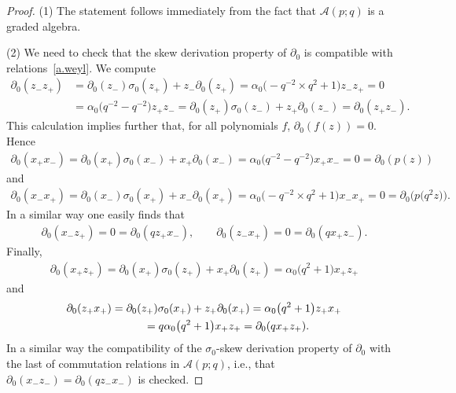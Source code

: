 \documentclass[pdftex]{sigma}
\numberwithin{equation}{section}
\def\AWeyl#1#2{{\mathcal{A}}(#1;#2)}
\begin{document}
\begin{proof}
(1) The statement follows immediately from the fact that $\AWeyl p q$ is a graded algebra.

(2) We need to check that the skew derivation property of $\partial_0$ is compatible with rela\-tions~\eqref{a.weyl}. We compute
\begin{align*}
\partial_0(z_-z_+) &= \partial_0(z_-)\sigma_0(z_+) + z_- \partial_0(z_+) = \alpha_0\big({-}q^{-2} \times q^2 + 1\big)z_- z_+ = 0\\
&= \alpha_0\big(q^{-2} - q^{-2}\big) z_+ z_- = \partial_0(z_+)\sigma_0(z_-) + z_+ \partial_0(z_-) =\partial_0(z_+z_-).
\end{align*}
This calculation implies further that, for all polynomials $f$, $\partial_0(f(z)) =0$. Hence
\begin{gather*}
\partial_0 (x_+x_-) = \partial_0(x_+)\sigma_0(x_-) + x_+ \partial_0(x_-) = \alpha_0\big(q^{-2} - q^{-2}\big) x_+ x_- = 0 = \partial_0 (p(z))
\end{gather*}
and
\begin{gather*}
\partial_0(x_-x_+) = \partial_0(x_-)\sigma_0(x_+) + x_- \partial_0(x_+) = \alpha_0\big({-}q^{-2} \times q^2 + 1\big)x_- x_+ = 0 = \partial_0 \big(p\big(q^2z\big)\big).
\end{gather*}
In a similar way one easily f\/inds that
\begin{gather*}
\partial_0(x_-z_+) = 0 = \partial_0(qz_+x_-), \qquad \partial_0(z_-x_+) = 0 = \partial_0(qx_+z_-).
\end{gather*}
Finally,
\begin{gather*}
\partial_0(x_+z_+) = \partial_0(x_+)\sigma_0(z_+) + x_+ \partial_0(z_+) = \alpha_0\big( q^2 + 1\big)x_+ z_+
\end{gather*}
and
\begin{gather*}
\partial_0(z_+x_+) = \partial_0(z_+)\sigma_0(x_+) + z_+ \partial_0(x_+) = \alpha_0\big( q^2 + 1\big)z_+ x_+\\
 \hphantom{\partial_0(z_+x_+)}{} = q\alpha_0\big( q^2 + 1\big)x_+ z_+ = \partial_0(qx_+z_+) .
\end{gather*}
In a similar way the compatibility of the $\sigma_0$-skew derivation property of $\partial_0$ with the last of commutation relations in $\AWeyl p q$, i.e., that $\partial_0(x_-z_-) = \partial_0(q z_-x_-)$ is checked.


\end{proof}
\end{document}
